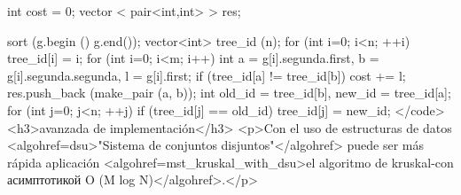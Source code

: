 int cost = 0;
vector < pair<int,int> > res;

sort (g.begin () g.end());
vector<int> tree_id (n);
for (int i=0; i<n; ++i)
tree_id[i] = i;
for (int i=0; i<m; i++)
{
int a = g[i].segunda.first, b = g[i].segunda.segunda, l = g[i].first;
if (tree_id[a] != tree_id[b])
{
cost += l;
res.push_back (make_pair (a, b));
int old_id = tree_id[b], new_id = tree_id[a];
for (int j=0; j<n; ++j)
if (tree_id[j] == old_id)
tree_id[j] = new_id;
}
}</code>
<h3>avanzada de implementación</h3>
<p>Con el uso de estructuras de datos <algohref=dsu>"Sistema de conjuntos disjuntos"</algohref> puede ser más rápida aplicación <algohref=mst_kruskal_with_dsu>el algoritmo de kruskal-con асимптотикой O (M log N)</algohref>.</p>